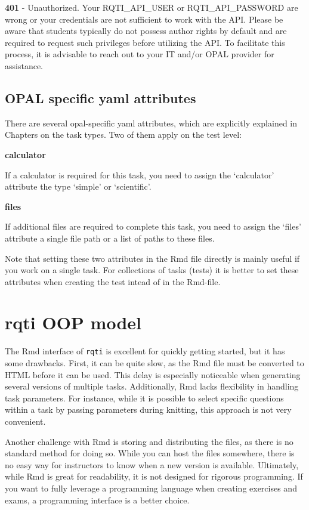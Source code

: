 \documentclass[twoside]{tufte-book}
\begin{document}
\textbf{401} - Unauthorized. Your RQTI\_API\_USER or RQTI\_API\_PASSWORD are wrong or your credentials are not sufficient to work with the API. Please be aware that students typically do not possess author rights by default and are required to request such privileges before utilizing the API. To facilitate this process, it is advisable to reach out to your IT and/or OPAL provider for assistance.

\section{OPAL specific yaml attributes}\label{opal-specific-yaml-attributes}

There are several opal-specific yaml attributes, which are explicitly explained in Chapters on the task types. Two of them apply on the test level:

\noindent\textbf{calculator}\label{calculator-1}

If a calculator is required for this task, you need to assign the `calculator' attribute the type `simple' or `scientific'.

\noindent\textbf{files}\label{files-1}

If additional files are required to complete this task, you need to assign the `files' attribute a single file path or a list of paths to these files.

Note that setting these two attributes in the Rmd file directly is mainly useful if you work on a single task. For collections of tasks (tests) it is better to set these attributes when creating the test intead of in the Rmd-file.

\chapter{rqti OOP model}\label{rqti-oop-model}

The Rmd interface of \texttt{rqti} is excellent for quickly getting started, but it has some drawbacks. First, it can be quite slow, as the Rmd file must be converted to HTML before it can be used. This delay is especially noticeable when generating several versions of multiple tasks. Additionally, Rmd lacks flexibility in handling task parameters. For instance, while it is possible to select specific questions within a task by passing parameters during knitting, this approach is not very convenient.

Another challenge with Rmd is storing and distributing the files, as there is no standard method for doing so. While you can host the files somewhere, there is no easy way for instructors to know when a new version is available. Ultimately, while Rmd is great for readability, it is not designed for rigorous programming. If you want to fully leverage a programming language when creating exercises and exams, a programming interface is a better choice.
\end{document}
